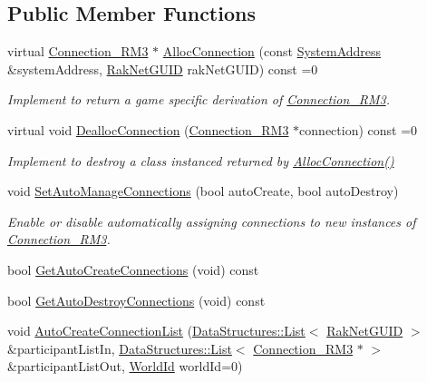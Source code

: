 \subsection*{Public Member Functions}
\begin{DoxyCompactItemize}
\item 
virtual \hyperlink{class_rak_net_1_1_connection___r_m3}{Connection\-\_\-\-R\-M3} $\ast$ \hyperlink{class_rak_net_1_1_replica_manager3_ade7df800d3dfd31bdd44de76172eb912}{Alloc\-Connection} (const \hyperlink{struct_rak_net_1_1_system_address}{System\-Address} \&system\-Address, \hyperlink{struct_rak_net_1_1_rak_net_g_u_i_d}{Rak\-Net\-G\-U\-I\-D} rak\-Net\-G\-U\-I\-D) const =0
\begin{DoxyCompactList}\small\item\em Implement to return a game specific derivation of \hyperlink{class_rak_net_1_1_connection___r_m3}{Connection\-\_\-\-R\-M3}. \end{DoxyCompactList}\item 
virtual void \hyperlink{class_rak_net_1_1_replica_manager3_a78b449c8e3caa9a343a7d273f768687c}{Dealloc\-Connection} (\hyperlink{class_rak_net_1_1_connection___r_m3}{Connection\-\_\-\-R\-M3} $\ast$connection) const =0
\begin{DoxyCompactList}\small\item\em Implement to destroy a class instanced returned by \hyperlink{class_rak_net_1_1_replica_manager3_ade7df800d3dfd31bdd44de76172eb912}{Alloc\-Connection()} \end{DoxyCompactList}\item 
void \hyperlink{class_rak_net_1_1_replica_manager3_af7e33dfb956e311cde40a97c9f89dc8e}{Set\-Auto\-Manage\-Connections} (bool auto\-Create, bool auto\-Destroy)
\begin{DoxyCompactList}\small\item\em Enable or disable automatically assigning connections to new instances of \hyperlink{class_rak_net_1_1_connection___r_m3}{Connection\-\_\-\-R\-M3}. \end{DoxyCompactList}\item 
bool \hyperlink{class_rak_net_1_1_replica_manager3_a71cf90c3a8441becc6080a6dbff8965a}{Get\-Auto\-Create\-Connections} (void) const 
\item 
bool \hyperlink{class_rak_net_1_1_replica_manager3_a0684b19dc05fe5f8cf9ca588b47f8223}{Get\-Auto\-Destroy\-Connections} (void) const 
\item 
void \hyperlink{class_rak_net_1_1_replica_manager3_aac9e84d2ea13026c6e05ec667897e692}{Auto\-Create\-Connection\-List} (\hyperlink{class_data_structures_1_1_list}{Data\-Structures\-::\-List}$<$ \hyperlink{struct_rak_net_1_1_rak_net_g_u_i_d}{Rak\-Net\-G\-U\-I\-D} $>$ \&participant\-List\-In, \hyperlink{class_data_structures_1_1_list}{Data\-Structures\-::\-List}$<$ \hyperlink{class_rak_net_1_1_connection___r_m3}{Connection\-\_\-\-R\-M3} $\ast$ $>$ \&participant\-List\-Out, \hyperlink{group___r_e_p_l_i_c_a___m_a_n_a_g_e_r___g_r_o_u_p3_ga44b59af8e882248f61aa41d8ace38bf7}{World\-Id} world\-Id=0)

\end{DoxyCompactItemize}
